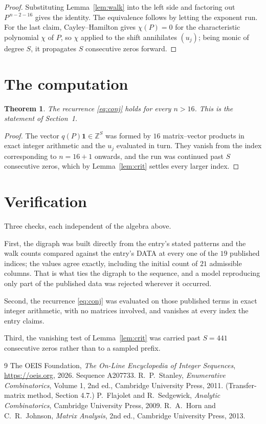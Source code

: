 \documentclass[11pt,a4paper]{article}
\theoremstyle{plain}
\newtheorem{theorem}{Theorem}
\theoremstyle{definition}
\begin{document}
\begin{proof}
Substituting Lemma~\ref{lem:walk} into the left side and factoring out
$P^{\,n-2-16}$ gives the identity. The equivalence follows by letting the exponent
run. For the last claim, Cayley--Hamilton gives $\chi(P)=0$ for the characteristic
polynomial $\chi$ of $P$, so $\chi$ applied to the shift annihilates $(u_j)$; being monic of
degree $S$, it propagates $S$ consecutive zeros forward.
\end{proof}

\section{The computation}

\begin{theorem}
The recurrence \eqref{eq:conj} holds for every $n>16$. This is the statement of
Section~1.
\end{theorem}

\begin{proof}
The vector $q(P)\mathbf{1}\in\mathbb{Z}^{S}$ was formed by $16$ matrix--vector
products in exact integer arithmetic and the $u_j$ evaluated in turn. They vanish from the
index corresponding to $n=16+1$ onwards, and the run was continued past $S$ consecutive
zeros, which by Lemma~\ref{lem:crit} settles every larger index.
\end{proof}

\section{Verification}

Three checks, each independent of the algebra above.

First, the digraph was built directly from the entry's stated patterns and the walk counts
compared against the entry's DATA at every one of the $19$ published indices; the
values agree exactly, including the initial count of $21$ admissible columns. That is
what ties the digraph to the sequence, and a model reproducing only part of the published
data was rejected wherever it occurred.

Second, the recurrence \eqref{eq:conj} was evaluated on those published terms in exact
integer arithmetic, with no matrices involved, and vanishes at every index the entry claims.

Third, the vanishing test of Lemma~\ref{lem:crit} was carried past $S=441$ consecutive
zeros rather than to a sampled prefix.

\begin{thebibliography}{9}
 The OEIS Foundation, \emph{The On-Line Encyclopedia of Integer
Sequences}, \url{https://oeis.org}, 2026. Sequence A207733.
 R.~P.~Stanley, \emph{Enumerative Combinatorics}, Volume 1, 2nd ed.,
Cambridge University Press, 2011. (Transfer-matrix method, Section 4.7.)
 P.~Flajolet and R.~Sedgewick, \emph{Analytic Combinatorics}, Cambridge
University Press, 2009.
 R.~A.~Horn and C.~R.~Johnson, \emph{Matrix Analysis}, 2nd ed., Cambridge
University Press, 2013.
\end{thebibliography}
\end{document}
